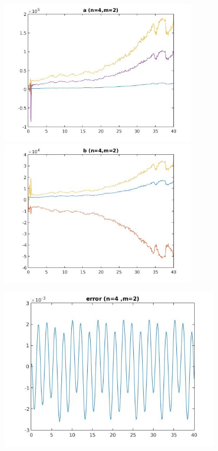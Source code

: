 \documentclass{article}
\begin{document}
\clearpage
\large
\begin{figure}[h!]
\centering 
 	  \begin{minipage}{0.48\textwidth}
     \centering
     \advance\leftskip-4cm
  \includegraphics[width=100mm,scale=2]{assets/try42o.jpg}
   \end{minipage} \hfill
    \begin{minipage}{0.48\textwidth}
  \includegraphics[width=100mm,scale=2]{assets/try42oo.jpg}
  \end{minipage}
\end{figure}
\begin{figure}[h!]
\centering
\advance\leftskip-0.5cm
 \includegraphics[width=140mm,scale=2]{assets/try42ooo.jpg}
\end{figure}
\end{document}
